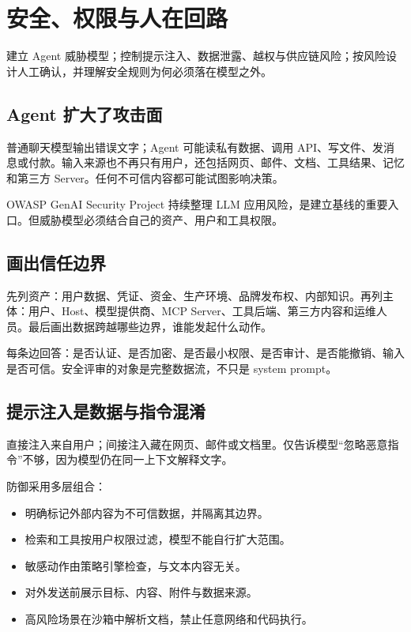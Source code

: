 \chapter{安全、权限与人在回路}
\label{chap:security}

\begin{takeaway}[学习目标]
建立 Agent 威胁模型；控制提示注入、数据泄露、越权与供应链风险；按风险设计人工确认，并理解安全规则为何必须落在模型之外。
\end{takeaway}

\section{Agent 扩大了攻击面}

普通聊天模型输出错误文字；Agent 可能读私有数据、调用 API、写文件、发消息或付款。输入来源也不再只有用户，还包括网页、邮件、文档、工具结果、记忆和第三方 Server。任何不可信内容都可能试图影响决策。

OWASP GenAI Security Project 持续整理 LLM 应用风险，是建立基线的重要入口\citep{owasp_llm_top10}。但威胁模型必须结合自己的资产、用户和工具权限。

\section{画出信任边界}

先列资产：用户数据、凭证、资金、生产环境、品牌发布权、内部知识。再列主体：用户、Host、模型提供商、MCP Server、工具后端、第三方内容和运维人员。最后画出数据跨越哪些边界，谁能发起什么动作。

每条边回答：是否认证、是否加密、是否最小权限、是否审计、是否能撤销、输入是否可信。安全评审的对象是完整数据流，不只是 system prompt。

\section{提示注入是数据与指令混淆}

直接注入来自用户；间接注入藏在网页、邮件或文档里。仅告诉模型“忽略恶意指令”不够，因为模型仍在同一上下文解释文字。

防御采用多层组合：

\begin{itemize}
  \item 明确标记外部内容为不可信数据，并隔离其边界。
  \item 检索和工具按用户权限过滤，模型不能自行扩大范围。
  \item 敏感动作由策略引擎检查，与文本内容无关。
  \item 对外发送前展示目标、内容、附件与数据来源。
  \item 高风险场景在沙箱中解析文档，禁止任意网络和代码执行。
\end{itemize}

